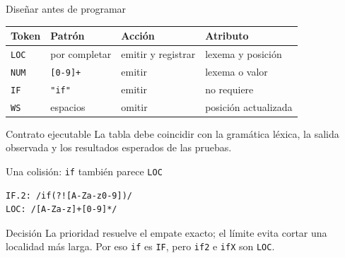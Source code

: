 \documentclass[11pt,spanish]{beamer}
\begin{document}
\begin{frame}{Diseñar antes de programar}
\vfill

\begin{center}
\small
\renewcommand{\arraystretch}{1.3}
\begin{tabular}{|L{.18\textwidth}|L{.24\textwidth}|L{.20\textwidth}|L{.22\textwidth}|}
\hline
\textbf{Token} & \textbf{Patrón} & \textbf{Acción} & \textbf{Atributo} \\
\hline
\texttt{LOC} & por completar & emitir y registrar & lexema y posición \\
\hline
\texttt{NUM} & \texttt{[0-9]+} & emitir & lexema o valor \\
\hline
\texttt{IF} & \texttt{"if"} & emitir & no requiere \\
\hline
\texttt{WS} & espacios & omitir & posición actualizada \\
\hline
\end{tabular}
\end{center}

\bigskip

\begin{block}{Contrato ejecutable}
La tabla debe coincidir con la gramática léxica, la salida observada y los resultados esperados de las pruebas.
\end{block}

\vfill
\end{frame}

\begin{frame}[fragile]{Una colisión: \texttt{if} también parece \texttt{LOC}}
\vfill

\begin{center}
\end{center}

\bigskip

\begin{lstlisting}[language={}]
IF.2: /if(?![A-Za-z0-9])/
LOC: /[A-Za-z]+[0-9]*/
\end{lstlisting}

\begin{block}{Decisión}
La prioridad resuelve el empate exacto; el límite evita cortar una localidad más larga. Por eso \texttt{if} es \texttt{IF}, pero \texttt{if2} e \texttt{ifX} son \texttt{LOC}.
\end{block}

\vfill
\end{frame}
\end{document}
